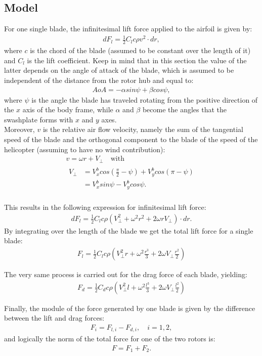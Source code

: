 \subsection{Model}
For one single blade, the infinitesimal lift force applied to the airfoil is given by:
\begin{align*}
    dF_l=\frac{1}{2} C_l c \rho v^2 \cdot dr,
\end{align*}
where $c$ is the chord of the blade (assumed to be constant over the length of it) and $C_l$ is the lift coefficient. Keep in mind that in this section the value of the latter depends on the angle of attack of the blade, which is assumed to be independent of the distance from the rotor hub and equal to:
\begin{align*}
    AoA=-\alpha sin\psi + \beta cos\psi,
\end{align*}
where $\psi$ is the angle the blade has traveled rotating from the positive direction of the $x$ axis of the body frame, while $\alpha$ and $\beta$ become the angles that the swashplate forms with $x$ and $y$ axes. \\
Moreover, $v$ is the relative air flow velocity, namely the sum of the tangential speed of the blade and the orthogonal component to the blade of the speed of the helicopter (assuming to have no wind contribution): 
\begin{gather*}
    v=\omega r+V_\perp \quad \text{with} \\
    \begin{split}
        V_\perp &= V^b_x cos\left(\frac{\pi}{2}-\psi \right)+V^b_y cos(\pi-\psi) \\
        &= V^b_x sin\psi-V^b_y cos\psi.
    \end{split}
\end{gather*}
\\
This results in the following expression for infinitesimal lift force:
\begin{align*}
    dF_l=\frac{1}{2} C_l c \rho (V_\perp^2+\omega^2 r^2+2\omega r V_\perp) \cdot dr.
\end{align*}
By integrating over the length of the blade we get the total lift force for a single blade:
\begin{align*}
    F_l=\frac{1}{2} C_l c \rho  \left(V_\perp^2 r+\omega^2 \frac{r^3}{3}+2\omega V_\perp\frac{r^2}{2}\right)
\end{align*}

The very same process is carried out for the drag force of each blade, yielding:
\begin{align*}
    F_d = \frac{1}{2} C_d c \rho \left(V_\perp^2 l+\omega^2 \frac{l^3}{3}+2\omega V_\perp\frac{l^2}{2}\right)
\end{align*}

Finally, the module of the force generated by one blade is given by the difference between the lift and drag forces:
\begin{align*}
    F_i=F_{l,i}-F_{d,i}, \quad i=1,2,
\end{align*}
and logically the norm of the total force for one of the two rotors is:
\begin{align*}
    F=F_1+F_2.
\end{align*}